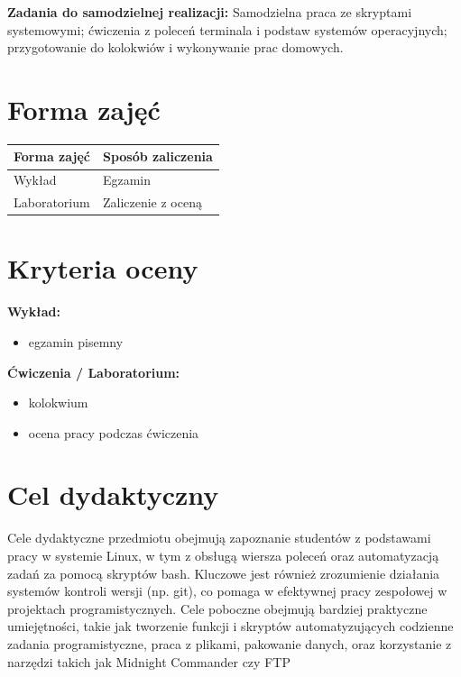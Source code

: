 \documentclass[12pt, a4paper]{article}
\newcommand{\thdrule}{\noalign{\global\setlength{\extrarowheight}{0pt}}}
\newcommand{\thdend}{\noalign{\global\setlength{\extrarowheight}{3pt}}}
\begin{document}
\vspace{4pt}
\noindent\textbf{Zadania do samodzielnej realizacji:} Samodzielna praca ze skryptami systemowymi; ćwiczenia z poleceń terminala i podstaw systemów operacyjnych; przygotowanie do kolokwiów i wykonywanie prac domowych.

\section{Forma zajęć}

\begin{center}
{\scriptsize
\begin{tabular}{m{5cm}m{8cm}}
\thdrule\toprule
\rowcolor{pjatkRed} {\color{white}\textbf{Forma zajęć}} & {\color{white}\textbf{Sposób zaliczenia}} \\
\midrule\thdend
  \rowcolor{tableRowLight} Wykład & Egzamin \\
  \rowcolor{tableRowAlt} Laboratorium & Zaliczenie z oceną \\
\bottomrule
\end{tabular}}
\end{center}

\section{Kryteria oceny}

\textbf{Wykład:}
\begin{itemize}
  \item egzamin pisemny
\end{itemize}
\vspace{4pt}
\textbf{Ćwiczenia / Laboratorium:}
\begin{itemize}
  \item kolokwium
  \item ocena pracy podczas ćwiczenia
\end{itemize}


\section{Cel dydaktyczny}

Cele dydaktyczne przedmiotu obejmują zapoznanie studentów z podstawami pracy w systemie Linux, w tym z obsługą wiersza poleceń oraz automatyzacją zadań za pomocą skryptów bash. Kluczowe jest również zrozumienie działania systemów kontroli wersji (np. git), co pomaga w efektywnej pracy zespołowej w projektach programistycznych. Cele poboczne obejmują bardziej praktyczne umiejętności, takie jak tworzenie funkcji i skryptów automatyzujących codzienne zadania programistyczne, praca z plikami, pakowanie danych, oraz korzystanie z narzędzi takich jak Midnight Commander czy FTP
\end{document}
